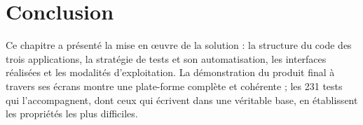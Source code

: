 \section*{Conclusion}

Ce chapitre a présenté la mise en \oe uvre de la solution : la structure du code
des trois applications, la stratégie de tests et son automatisation, les
interfaces réalisées et les modalités d'exploitation. La démonstration du
produit final à travers ses écrans montre une plate-forme complète et
cohérente ; les 231 tests qui l'accompagnent, dont ceux qui écrivent dans une
véritable base, en établissent les propriétés les plus difficiles.
